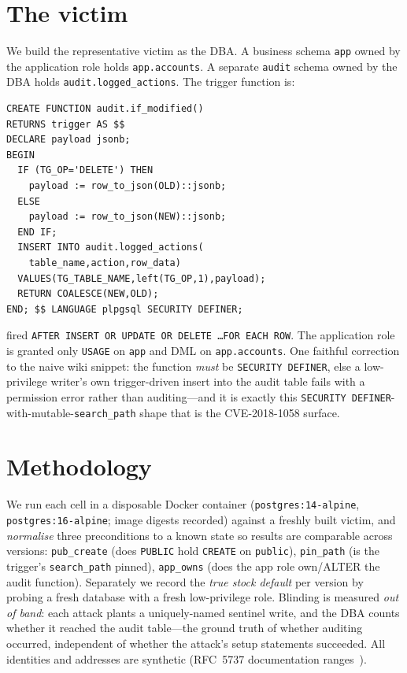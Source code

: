 \documentclass[11pt]{article}
\newcommand{\code}[1]{\texttt{#1}}
\begin{document}
\section{The victim}
We build the representative victim as the DBA. A business schema \code{app} owned by the
application role holds \code{app.accounts}. A separate \code{audit} schema owned by the DBA
holds \code{audit.logged\_actions}. The trigger function is:
\begin{lstlisting}
CREATE FUNCTION audit.if_modified()
RETURNS trigger AS $$
DECLARE payload jsonb;
BEGIN
  IF (TG_OP='DELETE') THEN
    payload := row_to_json(OLD)::jsonb;
  ELSE
    payload := row_to_json(NEW)::jsonb;
  END IF;
  INSERT INTO audit.logged_actions(
    table_name,action,row_data)
  VALUES(TG_TABLE_NAME,left(TG_OP,1),payload);
  RETURN COALESCE(NEW,OLD);
END; $$ LANGUAGE plpgsql SECURITY DEFINER;
\end{lstlisting}
fired \code{AFTER INSERT OR UPDATE OR DELETE \ldots FOR EACH ROW}. The application role is
granted only \code{USAGE} on \code{app} and DML on \code{app.accounts}. One faithful
correction to the naive wiki snippet: the function \emph{must} be \code{SECURITY DEFINER},
else a low-privilege writer's own trigger-driven insert into the audit table fails with a
permission error rather than auditing---and it is exactly this
\code{SECURITY DEFINER}-with-mutable-\code{search\_path} shape that is the CVE-2018-1058
surface.

\section{Methodology}
We run each cell in a disposable Docker container (\code{postgres:14-alpine},
\code{postgres:16-alpine}; image digests recorded) against a freshly built victim, and
\emph{normalise} three preconditions to a known state so results are comparable across
versions: \code{pub\_create} (does \code{PUBLIC} hold \code{CREATE} on \code{public}),
\code{pin\_path} (is the trigger's \code{search\_path} pinned), \code{app\_owns} (does the
app role own/ALTER the audit function). Separately we record the \emph{true stock default}
per version by probing a fresh database with a fresh low-privilege role. Blinding is
measured \emph{out of band}: each attack plants a uniquely-named sentinel write, and the
DBA counts whether it reached the audit table---the ground truth of whether auditing
occurred, independent of whether the attack's setup statements succeeded. All identities
and addresses are synthetic (RFC~5737 documentation ranges~\cite{rfc5737}).
\end{document}
